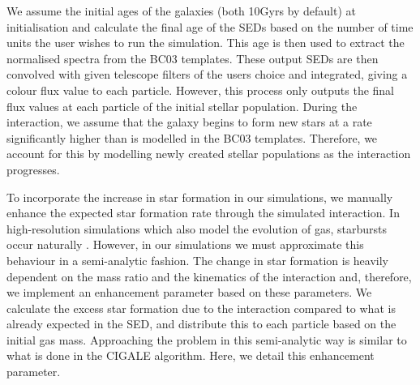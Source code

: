 We assume the initial ages of the galaxies (both 10Gyrs by default) at initialisation and calculate the final age of the SEDs based on the number of time units the user wishes to run the simulation. This age is then used to extract the normalised spectra from the BC03 templates. These output SEDs are then convolved with given telescope filters of the users choice and integrated, giving a colour flux value to each particle. However, this process only outputs the final flux values at each particle of the initial stellar population. During the interaction, we assume that the galaxy begins to form new stars at a rate significantly higher than is modelled in the BC03 templates. Therefore, we account for this by modelling newly created stellar populations as the interaction progresses.

To incorporate the increase in star formation in our simulations, we manually enhance the expected star formation rate through the simulated interaction. In high-resolution simulations which also model the evolution of gas, starbursts occur naturally \citep{2009PASJ...61..481S}. However, in our simulations we must approximate this behaviour in a semi-analytic fashion. The change in star formation is heavily dependent on the mass ratio and the kinematics of the interaction and, therefore, we implement an enhancement parameter based on these parameters. We calculate the excess star formation due to the interaction compared to what is already expected in the SED, and distribute this to each particle based on the initial gas mass. Approaching the problem in this semi-analytic way is similar to what is done in the CIGALE \citep{2019A&A...622A.103B} algorithm. Here, we detail this enhancement parameter.

